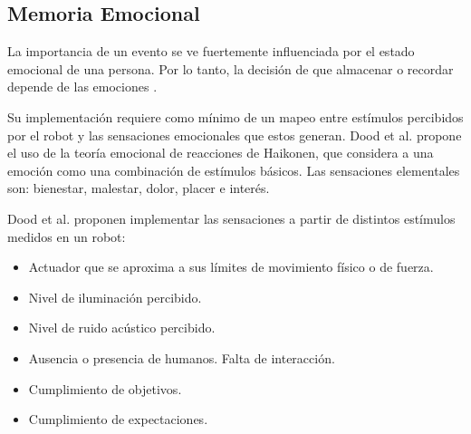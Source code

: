 %

%



\subsection{Memoria Emocional}

La importancia de un evento se ve fuertemente influenciada por el estado emocional de una persona. Por lo tanto, la decisión de que almacenar o recordar depende de las emociones \cite{Deutsch2008}.

Su implementación requiere como mínimo de un mapeo entre estímulos percibidos por el robot y las sensaciones emocionales que estos generan. Dood et al. \cite{Dodd2005} propone el uso de la teoría emocional de reacciones de Haikonen, que considera a una emoción como una combinación de estímulos básicos. Las sensaciones elementales son: bienestar, malestar, dolor, placer e interés.

Dood et al. proponen implementar las sensaciones a partir de distintos estímulos medidos en un robot:

\begin{itemize}[topsep=0pt]
\setlength\itemsep{0.2em}
\item Actuador que se aproxima a sus límites de movimiento físico o de fuerza. 
\item Nivel de iluminación percibido.
\item Nivel de ruido acústico percibido.
\item Ausencia o presencia de humanos. Falta de interacción.
\item Cumplimiento de objetivos.
\item Cumplimiento de expectaciones.
\end{itemize}



